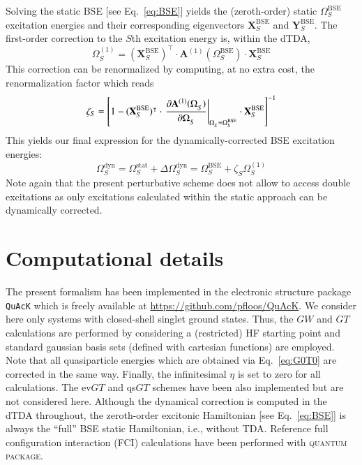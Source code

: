 \documentclass[aip,jcp,reprint,noshowkeys,superscriptaddress]{revtex4-1}
\newcommand{\QP}{\textsc{quantum package}}
\newcommand{\T}[1]{#1^{\intercal}}
\newcommand{\BSE}{\text{BSE}}
\newcommand{\Om}[2]{\Omega_{#1}^{#2}}
\newcommand{\bA}[2]{\mathbf{A}_{#1}^{#2}}
\newcommand{\bX}[2]{\mathbf{X}_{#1}^{#2}}
\newcommand{\bY}[2]{\mathbf{Y}_{#1}^{#2}}
\begin{document}
Solving the static BSE [see Eq.~\eqref{eq:BSE}] yields the (zeroth-order) static $\Om{S}{\BSE}$ excitation energies and their corresponding eigenvectors $\bX{S}{\BSE}$ and $\bY{S}{\BSE}$. 
The first-order correction to the $S$th excitation energy is, within the dTDA,
\begin{equation}
\label{eq:Om1-TDA}
	\Om{S}{(1)} = \T{(\bX{S}{\BSE})} \cdot \bA{}{(1)}(\Om{S}{\BSE}) \cdot \bX{S}{\BSE}
\end{equation}
This correction can be renormalized by computing, at no extra cost, the renormalization factor which reads
\begin{equation}
\label{eq:Z}
	\zeta_{S} = \qty[ 1 - \T{(\bX{S}{\BSE})} \cdot \eval{\pdv{\bA{}{(1)}(\Om{S}{})}{\Om{S}{}}}_{\Om{S}{} = \Om{S}{\BSE}} \cdot \bX{S}{\BSE} ]^{-1}
\end{equation}
This yields our final expression for the dynamically-corrected BSE excitation energies:
\begin{equation}
	\Om{S}{\text{dyn}} = \Om{S}{\text{stat}} + \Delta\Om{S}{\text{dyn}} = \Om{S}{\BSE} + \zeta_{S} \Om{S}{(1)}
\end{equation}
Note again that the present perturbative scheme does not allow to access double excitations as only excitations calculated within the static approach can be dynamically corrected.

\section{Computational details}
\label{sec:compdet}
The present formalism has been implemented in the electronic structure package \texttt{QuAcK} \cite{QuAcK} which is freely available at \url{https://github.com/pfloos/QuAcK}. 
We consider here only systems with closed-shell singlet ground states. 
Thus, the $GW$ and $GT$ calculations are performed by considering a (restricted) HF starting point and standard gaussian basis sets (defined with cartesian functions) are employed.
Note that all quasiparticle energies which are obtained via Eq.~\eqref{eq:G0T0} are corrected in the same way.
Finally, the infinitesimal $\eta$ is set to zero for all calculations.
The ev$GT$ and qs$GT$ schemes have been also implemented but are not considered here.
Although the dynamical correction is computed in the dTDA throughout, the zeroth-order excitonic Hamiltonian [see Eq.~\eqref{eq:BSE}] is always the ``full'' BSE static Hamiltonian, i.e., without TDA. 
Reference full configuration interaction (FCI) calculations have been performed with {\QP}. \cite{Garniron_2019}
\end{document}
